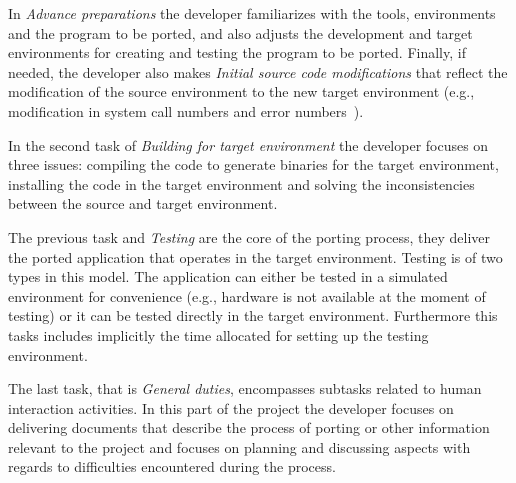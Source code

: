 In \textit{Advance preparations} the developer familiarizes with the tools,
environments and the program to be ported, and also adjusts the development and
target environments for creating and testing the program to be ported. Finally,
if needed, the developer also makes \textit{Initial source code modifications}
that reflect the modification of the source environment to the new target
environment (e.g., modification in system call numbers and error
numbers~\cite{callahanopenbsd}).

In the second task of \textit{Building for target environment} the developer
focuses on three issues: compiling the code to generate binaries for the
target environment, installing the code in the target environment and solving
the inconsistencies between the source and target environment.

The previous task and \textit{Testing} are the core of the porting process, they
deliver the ported application that operates in the target environment.
Testing is of two types in this model. The application can either be tested in a
simulated environment for convenience (e.g., hardware is not available at the
moment of testing) or it can be tested directly in the target environment.
Furthermore this tasks includes implicitly the time allocated for setting up the
testing environment.

The last task, that is \textit{General duties}, encompasses subtasks related to
human interaction activities. In this part of the project the developer focuses
on delivering documents that describe the process of porting or other
information relevant to the project and focuses on planning and discussing
aspects with regards to difficulties encountered during the process.

